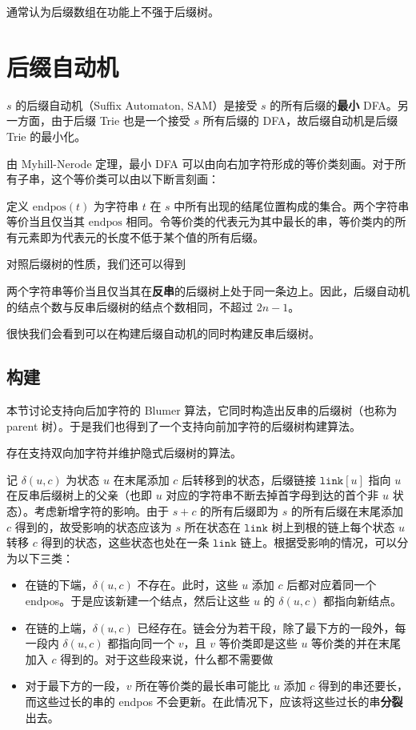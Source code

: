 通常认为后缀数组在功能上不强于后缀树。

\section{后缀自动机}

$s$ 的后缀自动机（Suffix Automaton, SAM）是接受 $s$ 的所有后缀的\textbf{最小} DFA。另一方面，由于后缀 Trie 也是一个接受 $s$ 所有后缀的 DFA，故后缀自动机是后缀 Trie 的最小化。

由 Myhill-Nerode 定理，最小 DFA 可以由向右加字符形成的等价类刻画。对于所有子串，这个等价类可以由以下断言刻画：

\begin{claim}
    定义 $\mathrm{endpos}(t)$ 为字符串 $t$ 在 $s$ 中所有出现的结尾位置构成的集合。两个字符串等价当且仅当其 $\mathrm{endpos}$ 相同。令等价类的代表元为其中最长的串，等价类内的所有元素即为代表元的长度不低于某个值的所有后缀。
\end{claim}

对照后缀树的性质，我们还可以得到
\begin{claim}
    两个字符串等价当且仅当其在\textbf{反串}的后缀树上处于同一条边上。因此，后缀自动机的结点个数与反串后缀树的结点个数相同，不超过 $2n-1$。
\end{claim}
\begin{remark}
    很快我们会看到可以在构建后缀自动机的同时构建反串后缀树。
\end{remark}

\subsection{构建}

本节讨论支持向后加字符的 Blumer 算法，它同时构造出反串的后缀树（也称为 parent 树）。于是我们也得到了一个支持向前加字符的后缀树构建算法。
\begin{remark}
    存在支持双向加字符并维护隐式后缀树的算法。
\end{remark}

记 $\delta(u,c)$ 为状态 $u$ 在末尾添加 $c$ 后转移到的状态，后缀链接 $\mathtt{link}[u]$ 指向 $u$ 在反串后缀树上的父亲（也即 $u$ 对应的字符串不断去掉首字母到达的首个非 $u$ 状态）。考虑新增字符的影响。由于 $s+c$ 的所有后缀即为 $s$ 的所有后缀在末尾添加 $c$ 得到的，故受影响的状态应该为 $s$ 所在状态在 $\mathtt{link}$ 树上到根的链上每个状态 $u$ 转移 $c$ 得到的状态，这些状态也处在一条 $\mathtt{link}$ 链上。根据受影响的情况，可以分为以下三类：

\begin{itemize}
    \item 在链的下端，$\delta(u,c)$ 不存在。此时，这些 $u$ 添加 $c$ 后都对应着同一个 endpos。于是应该新建一个结点，然后让这些 $u$ 的 $\delta(u,c)$ 都指向新结点。
    \item 在链的上端，$\delta(u,c)$ 已经存在。链会分为若干段，除了最下方的一段外，每一段内 $\delta(u,c)$ 都指向同一个 $v$，且 $v$ 等价类即是这些 $u$ 等价类的并在末尾加入 $c$ 得到的。对于这些段来说，什么都不需要做
    \item 对于最下方的一段，$v$ 所在等价类的最长串可能比 $u$ 添加 $c$ 得到的串还要长，而这些过长的串的 endpos 不会更新。在此情况下，应该将这些过长的串\textbf{分裂}出去。
\end{itemize}

